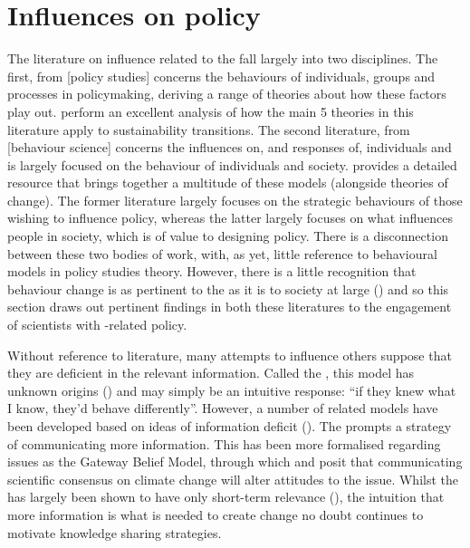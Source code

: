\section{Influences on policy}\label{sec:litinfluence}

The literature on influence related to the \SPI{} fall largely into two disciplines. The first, from [policy studies] concerns the behaviours of individuals, groups and processes in policymaking, deriving a range of theories about how these factors play out. \textcite{KernR2018} perform an excellent analysis of how the main 5 theories in this literature apply to sustainability transitions. The second literature, from [behaviour science] concerns the influences on, and responses of, individuals and is largely focused on the behaviour of individuals and society. \textcite{Darnton2008} provides a detailed resource that brings together a multitude of these models (alongside theories of change). The former literature largely focuses on the strategic behaviours of those wishing to influence policy, whereas the latter largely focuses on what influences people in society, which is of value to designing policy. There is a disconnection between these two bodies of work, with, as yet, little reference to behavioural models in policy studies theory. However, there is a little recognition that behaviour change is as pertinent to the \SPI{} as it is to society at large (\cite{CairneyW2017}) and so this section draws out pertinent findings in both these literatures to the engagement of scientists with \CAN-related policy.

Without reference to literature, many attempts to influence others suppose that they are deficient in the relevant information. Called the \IDM{}, this model has unknown origins (\cite{Nerlich2017}) and may simply be an intuitive response: ``if they knew what I know, they'd behave differently''. However, a number of related models have been developed based on ideas of information deficit (\cite{Darnton2008}). The \IDM{} prompts a strategy of communicating more information. This has been more formalised regarding \CAN{} issues as the Gateway Belief Model, through which \textcite{vanderLindenLFM2015} and \textcite{vanderLinden2021} posit that communicating scientific consensus on climate change will alter attitudes to the issue. Whilst the \IDM{} has largely been shown to have only short-term relevance (\cite[p24-5]{BA2024trust}), the intuition that more information is what is needed to create change no doubt continues to motivate knowledge sharing strategies.

